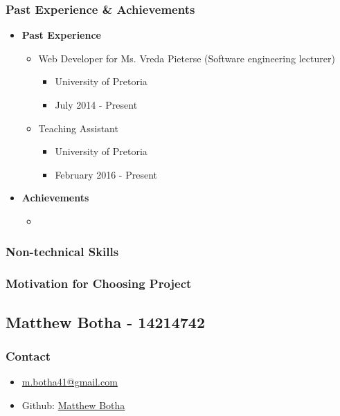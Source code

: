 \documentclass{article}
\begin{document}
	\subsubsection{Past Experience \& Achievements}
		\begin{itemize}
			\item \textbf{Past Experience}
			\begin{itemize}
				\item Web Developer for Ms. Vreda Pieterse (Software engineering lecturer)
				\begin{itemize}
					\item University of Pretoria
					\item July 2014 - Present
				\end{itemize}
				\item Teaching Assistant
				\begin{itemize}
					\item University of Pretoria
					\item February 2016 - Present
				\end{itemize}
			\end{itemize}
			
			\item \textbf{Achievements}
			\begin{itemize}
				\item
			\end{itemize}
		\end{itemize}
		
	\subsubsection{Non-technical Skills}
	\subsubsection{Motivation for Choosing Project}
	
	\newpage
	\subsection{Matthew Botha - 14214742}
		\subsubsection{Contact}
			\begin{itemize}
				\item \href{mailto:m.botha41@gmail.com}{m.botha41@gmail.com}
				\item Github: \href{https://github.com/MatthewBotha}{Matthew Botha}
			\end{itemize}
\end{document}
